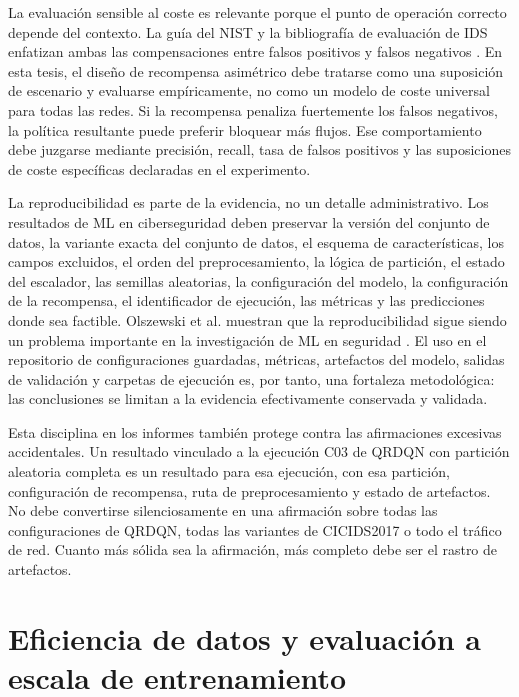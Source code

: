 La evaluación sensible al coste es relevante porque el punto de operación correcto depende del contexto. La guía del NIST y la bibliografía de evaluación de IDS enfatizan ambas las compensaciones entre falsos positivos y falsos negativos \parencite{ScarfoneMell2007,Cardenas2006IDSFramework}. En esta tesis, el diseño de recompensa asimétrico debe tratarse como una suposición de escenario y evaluarse empíricamente, no como un modelo de coste universal para todas las redes. Si la recompensa penaliza fuertemente los falsos negativos, la política resultante puede preferir bloquear más flujos. Ese comportamiento debe juzgarse mediante precisión, recall, tasa de falsos positivos y las suposiciones de coste específicas declaradas en el experimento.

La reproducibilidad es parte de la evidencia, no un detalle administrativo. Los resultados de ML en ciberseguridad deben preservar la versión del conjunto de datos, la variante exacta del conjunto de datos, el esquema de características, los campos excluidos, el orden del preprocesamiento, la lógica de partición, el estado del escalador, las semillas aleatorias, la configuración del modelo, la configuración de la recompensa, el identificador de ejecución, las métricas y las predicciones donde sea factible. Olszewski et al. muestran que la reproducibilidad sigue siendo un problema importante en la investigación de ML en seguridad \parencite{Olszewski2023ReproSecurityML}. El uso en el repositorio de configuraciones guardadas, métricas, artefactos del modelo, salidas de validación y carpetas de ejecución es, por tanto, una fortaleza metodológica: las conclusiones se limitan a la evidencia efectivamente conservada y validada.

Esta disciplina en los informes también protege contra las afirmaciones excesivas accidentales. Un resultado vinculado a la ejecución C03 de QRDQN con partición aleatoria completa es un resultado para esa ejecución, con esa partición, configuración de recompensa, ruta de preprocesamiento y estado de artefactos. No debe convertirse silenciosamente en una afirmación sobre todas las configuraciones de QRDQN, todas las variantes de CICIDS2017 o todo el tráfico de red. Cuanto más sólida sea la afirmación, más completo debe ser el rastro de artefactos.

\section{Eficiencia de datos y evaluación a escala de entrenamiento}

